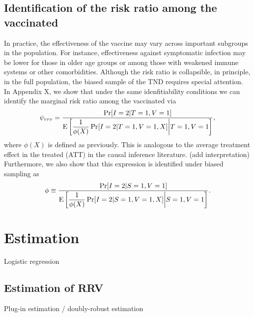 \documentclass[11pt]{article}
\begin{document}
\subsection{Identification of the risk ratio among the vaccinated}
In practice, the effectiveness of the vaccine may vary across important subgroups in the population. For instance, effectiveness against symptomatic infection may be lower for those in older age groups or among those with weakened immune systems or other comorbidities. Although the risk ratio is collapsible, in principle, in the full population, the biased sample of the TND requires special attention. In Appendix X, we show that under the same idenfitiability conditions we can identify the marginal risk ratio among the vaccinated via
\begin{equation*}
    \psi_{rrv} =  \dfrac{\Pr[I = 2 | T = 1, V = 1]}{\operatorname{E}\left[\dfrac{1}{\phi(X)} \Pr[I = 2 | T = 1, V = 1, X] \bigg| T = 1, V = 1\right]},
\end{equation*}
where $\phi(X)$ is defined as previously. This is analogous to the average treatment effect in the treated (ATT) in the causal inference literature. (add interpretation) Furthermore, we also show that this expression is identified under biased sampling as
\begin{equation}
    \phi \equiv \dfrac{\Pr[I=2 | S = 1, V = 1]}{\operatorname{E}\left[\dfrac{1}{\phi(X)} \Pr[I = 2 | S = 1, V = 1, X] \bigg| S = 1, V = 1\right]}.
\end{equation}


\section{Estimation}
Logistic regression
\subsection{Estimation of RRV}
 Plug-in estimation / doubly-robust estimation
\end{document}

